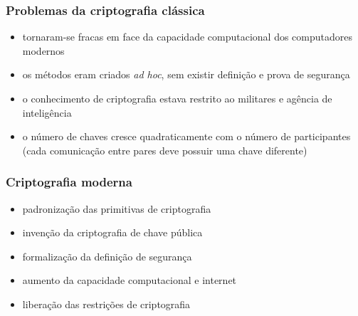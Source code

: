 \begin{frame}
\frametitle{Problemas da criptografia clássica}
\begin{itemize}
\item tornaram-se fracas em face da capacidade computacional dos computadores modernos
\item os métodos eram criados \emph{ad hoc}, sem existir definição e prova de segurança
\item o conhecimento de criptografia estava restrito ao militares e agência de inteligência
\item o número de chaves cresce quadraticamente com o número de participantes (cada comunicação entre pares deve possuir uma chave diferente)
\end{itemize}
\end{frame}

\begin{frame}
\frametitle{Criptografia moderna}
\begin{itemize}
\item padronização das primitivas de criptografia
\item invenção da criptografia de chave pública
\item formalização da definição de segurança
\item aumento da capacidade computacional e internet
\item liberação das restrições de criptografia
\end{itemize}
\end{frame}


